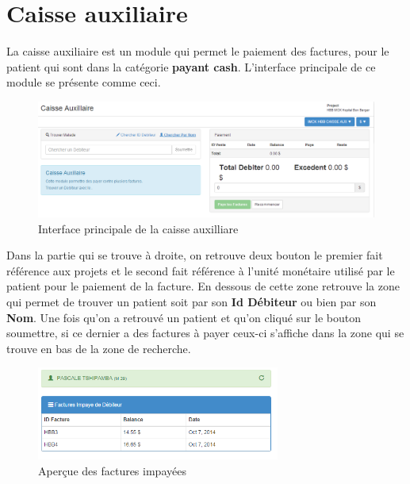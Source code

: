 \documentclass[12pt,a4paper]{report}
\begin{document}
\newpage
\section{Caisse auxiliaire}
La caisse auxiliaire est un module qui permet le paiement des factures, pour le patient qui sont dans la catégorie \textbf{payant cash}. L'interface principale de ce module se présente comme ceci.

\begin{figure}[h]
\begin{center}
\includegraphics[width=14cm]{pic/CaisseAuxillaire.png}
\end{center}
\caption{Interface principale de la caisse auxilliare}
\label{Interface principale de la caisse auxilliare}
\end{figure}

Dans la partie qui se trouve à droite, on retrouve deux bouton le premier fait référence aux projets et le second fait référence à l'unité monétaire utilisé par le patient pour le paiement de la facture. En dessous de cette zone retrouve la zone qui permet de trouver un patient soit par son \textbf{Id Débiteur} ou bien par son \textbf{Nom}. 
Une fois qu'on a retrouvé un patient et qu'on cliqué sur le bouton soumettre, si ce dernier a des factures à payer ceux-ci s'affiche dans la zone qui se trouve en bas de la zone de recherche. 

\begin{figure}[h]
\begin{center}
\includegraphics[width=8cm]{pic/ViewInvoice.png}
\end{center}
\caption{Aperçue des factures impayées}
\label{Aperçue des factures impayées}
\end{figure}
\end{document}
